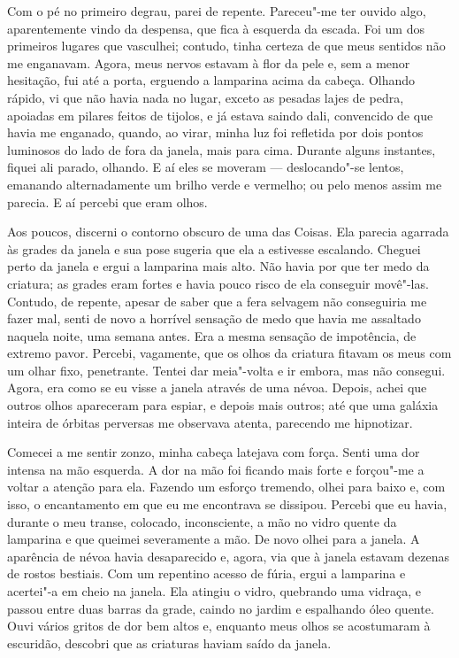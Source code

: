 Com o pé no primeiro degrau, parei de repente. Pareceu"-me ter ouvido algo, aparentemente vindo da despensa, que fica à
esquerda da escada. Foi um dos primeiros lugares que vasculhei; contudo, tinha certeza de que meus sentidos não me
enganavam. Agora, meus nervos estavam à flor da pele e, sem a menor hesitação, fui até a porta, erguendo a lamparina
acima da cabeça. Olhando rápido, vi que não havia nada no lugar, exceto as pesadas lajes de pedra, apoiadas em pilares
feitos de tijolos, e já estava saindo dali, convencido de que havia me enganado, quando, ao virar, minha luz foi
refletida por dois pontos luminosos do lado de fora da janela, mais para cima. Durante alguns instantes, fiquei ali
parado, olhando. E aí eles se moveram --- deslocando"-se lentos, emanando alternadamente um brilho verde e vermelho;
ou pelo menos assim me parecia. E aí percebi que eram olhos.

Aos poucos, discerni o contorno obscuro de uma das Coisas. Ela parecia agarrada às grades da janela e sua
pose sugeria que ela a estivesse escalando. Cheguei perto da janela e ergui a lamparina mais alto. Não havia por que ter medo da
criatura; as grades eram fortes e havia pouco risco de ela conseguir movê"-las. Contudo, de repente, apesar de saber que
a fera selvagem não conseguiria me fazer mal, senti de novo a horrível sensação de medo que havia me assaltado
naquela noite, uma semana antes. Era a mesma sensação de impotência, de extremo pavor. Percebi, vagamente, que os olhos
da criatura fitavam os meus com um olhar fixo, penetrante. Tentei dar meia"-volta e ir embora, mas não consegui. Agora,
era como se eu visse a janela através de uma névoa. Depois, achei que outros olhos apareceram para espiar, e depois
mais outros; até que uma galáxia inteira de órbitas perversas me observava atenta, parecendo me hipnotizar.

Comecei a me sentir zonzo, minha cabeça latejava com força. Senti uma dor intensa na mão esquerda. A dor na mão foi
ficando mais forte e forçou"-me a voltar a atenção para ela. Fazendo um esforço tremendo, olhei para baixo e, com isso,
o encantamento em que eu me encontrava se dissipou. Percebi que eu havia, durante o meu transe, colocado,
inconsciente, a mão no vidro quente da lamparina e que queimei severamente a mão. De novo olhei para a janela. A
aparência de névoa havia desaparecido e, agora, via que à janela estavam dezenas de rostos bestiais. Com um repentino
acesso de fúria, ergui a lamparina e acertei"-a em cheio na janela. Ela atingiu o vidro, quebrando uma vidraça, e passou
entre duas barras da grade, caindo no jardim e espalhando óleo quente. Ouvi vários gritos de dor bem altos e, enquanto
meus olhos se acostumaram à escuridão, descobri que as criaturas haviam saído da janela.

